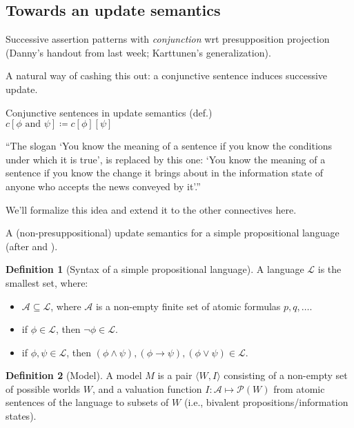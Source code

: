 \documentclass[nols,twoside,nofonts,nobib,nohyper]{tufte-handout}
\theoremstyle{definition}
\newtheorem{definition}{Definition}[section]
\begin{document}
\subsection{Towards an update semantics}

Successive assertion patterns with \textit{conjunction} wrt presupposition projection (Danny's handout from last week; Karttunen's generalization).

A natural way of cashing this out: a conjunctive sentence induces successive update.

\ex Conjunctive sentences in update semantics (def.)\\
$c[ϕ\text{ and }ψ] ≔ c[ϕ][ψ]$
\xe

\begin{displayquote}
\enquote{The slogan `You know the meaning of a sentence if you know the conditions under which it is true', is replaced by this one: `You know the meaning of a sentence if you know the change it brings about in the information state of anyone who accepts the news conveyed by it'.}
\end{displayquote}

We'll formalize this idea and extend it to the other connectives here.

A (non-presuppositional) update semantics for a simple propositional language (after \citealt{Veltman1996} and \citealt{Heim1983}).

\begin{definition}[Syntax of a simple propositional language]
  A language $\mathscr{L}$ is the smallest set, where:
  \begin{itemize}
      \item $\mathscr{A} ⊆ \mathscr{L}$, where $\mathscr{A}$ is a non-empty finite set of atomic formulas $p,q,…$.
      \item if $ϕ ∈ \mathscr{L}$, then $¬ ϕ ∈ \mathscr{L}$.
      \item if $ϕ,ψ ∈ \mathscr{L}$, then $(ϕ ∧ ψ), (ϕ → ψ), (ϕ ∨ ψ) ∈ \mathscr{L}$.
  \end{itemize}
\end{definition}


\begin{definition}[Model]
A model $M$ is a pair $⟨W,I⟩$ consisting of a non-empty set of possible worlds $W$, and a valuation function $I:\mathscr{A} ↦ \mathscr{P}(W)$ from atomic sentences of the language to subsets of $W$ (i.e., bivalent propositions/information states).
\end{definition}
\end{document}

